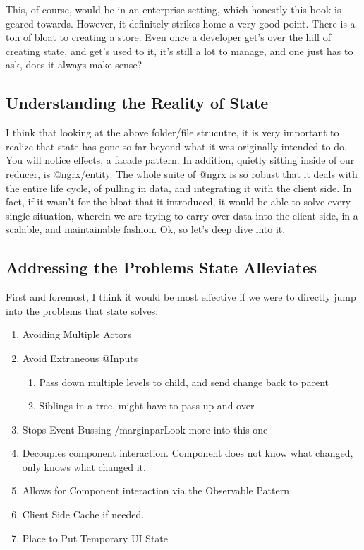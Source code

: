 

This, of course, would be in an enterprise setting, which honestly this book
is geared towards. However, it definitely strikes home a very good point. There
is a ton of bloat to creating a store. Even once a developer get's over the hill
of creating state, and get's used to it, it's still a lot to manage, and one
just has to ask, does it always make sense?

\subsection{Understanding the Reality of State}
I think that looking at the above folder/file strucutre, it is very important
to realize that state has gone so far beyond what it was originally intended to
do. You will notice effects, a facade pattern. In addition, quietly sitting
inside of our reducer, is @ngrx/entity. The whole suite of @ngrx is so robust
that it deals with the entire life cycle, of pulling in data, and integrating it
with the client side. In fact, if it wasn't for the bloat that it introduced,
it would be able to solve every single situation, wherein we are trying to carry
over data into the client side, in a scalable, and maintainable fashion. Ok, so
let's deep dive into it.

\subsection{ Addressing the Problems State Alleviates }
First and foremost, I think it would be most effective if we were to directly
jump into the problems that state solves:
\begin{enumerate}
  \item Avoiding Multiple Actors
  \item Avoid Extraneous @Inputs
  \begin{enumerate}
    \item Pass down multiple levels to child, and send change back to parent
    \item Siblings in a tree, might have to pass up and over
  \end{enumerate}
  \item Stops Event Bussing /marginpar{Look more into this one}
  \item Decouples component interaction. Component does not know what changed,
  only knows what changed it.
  \item Allows for Component interaction via the Observable Pattern
  \item Client Side Cache if needed.
  \item Place to Put Temporary UI State
\end{enumerate}

